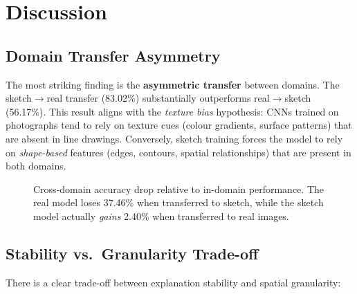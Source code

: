 \documentclass[12pt, a4paper]{article}
\begin{document}
\section{Discussion}
\label{sec:discussion}

\subsection{Domain Transfer Asymmetry}

The most striking finding is the \textbf{asymmetric transfer} between domains.
The sketch$\to$real transfer (83.02\%) substantially outperforms real$\to$sketch
(56.17\%).  This result aligns with the \emph{texture bias} hypothesis: CNNs
trained on photographs tend to rely on texture cues (colour gradients, surface
patterns) that are absent in line drawings.  Conversely, sketch training forces
the model to rely on \emph{shape-based} features (edges, contours, spatial
relationships) that are present in both domains.

\begin{figure}[H]
\centering
{}
\caption{Cross-domain accuracy drop relative to in-domain performance.  The
real model loses 37.46\% when transferred to sketch, while the sketch model
actually \emph{gains} 2.40\% when transferred to real images.}
\label{fig:domain_drop}
\end{figure}

\subsection{Stability vs.\ Granularity Trade-off}

There is a clear trade-off between explanation stability and spatial
granularity:
\end{document}
